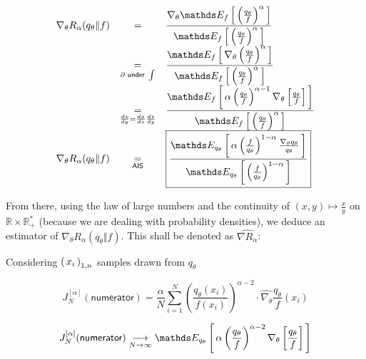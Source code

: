 $$\begin{array}{rcl}
\nabla_\theta R_\alpha(q_\theta \Vert f) 
&=& 
\displaystyle \frac 
{ \nabla_\theta \esperanceloi f { \left(\frac{q_\theta}{f}\right) ^\alpha} }
{ \esperanceloi f { \left(\frac{q_\theta}{f}\right) ^\alpha} }\\
&\underset{\partial \textsf{ under } \int}{=}& 
\displaystyle \frac {\esperanceloi f { \nabla_\theta \left(\frac{q_\theta}{f}\right) ^\alpha}}
{\esperanceloi f { \left(\frac{q_\theta}{f}\right) ^\alpha}}\\
&\underset{  \frac{dx}{dy} = \frac{dx}{dz}\frac{dz}{dy}   }{=}& 
\displaystyle \frac {\esperanceloi f { \alpha \left(\frac{q_\theta}{f}\right) ^{\alpha-1} \nabla_\theta\left[ \frac {q_\theta} f \right] }}
{\esperanceloi f { \left(\frac{q_\theta}{f}\right) ^\alpha}}\\
\nabla_\theta R_\alpha(q_\theta \Vert f) &\underset{\textsf{AIS}}{=}&
\boxed{ \displaystyle \frac {\esperanceloi {q_\theta} { \alpha \left(\frac{f}{q_\theta}\right) ^{1-\alpha} \frac {\nabla_\theta q_\theta} {q_\theta} }}
{\esperanceloi {q_\theta} { \left(\frac f {q_\theta}\right) ^{1-\alpha}}} }
\end{array}
$$


From there, using the law of large numbers and the continuity of $(x,y) \mapsto \frac x y$ on $\mathds R \times \mathds R_+^*$ (because we are dealing with probability densities), we deduce an estimator of $\nabla_\theta R_\alpha(q_\theta \Vert f)$. This shall be denoted as $\widehat{\nabla R_\alpha}$:

Considering $\left( \, {x} _ {i} \, \right)_{1, n}$ samples drawn from $q_\theta$

$$J_N^{[\alpha]}(\textsf{numerator}) = \frac \alpha N \sum\limits_{i=1}^N \left(\frac{q_\theta(x_i)}{f(x_i)}\right)^{\alpha - 2} \cdot \widehat{\nabla_\theta} \frac{q_\theta}{f}(x_i)$$

$$J_N^{[\alpha]}(\textsf{numerator}) \tend N \infty \esperanceloi {q_\theta} { \alpha \left(\frac{q_\theta}{f}\right) ^{\alpha-2} \nabla_\theta\left[ \frac {q_\theta} f \right] }$$

